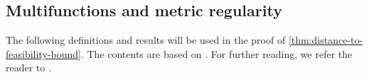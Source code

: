 

\subsection{Multifunctions and metric regularity}

The following definitions and results will be used in the proof of \cref{thm:distance-to-feasibility-bound}.
The contents are based on 
\cite{bonnans2013perturbation}.
For further reading, we refer the reader to \cite{rockafellar1998variational}.

